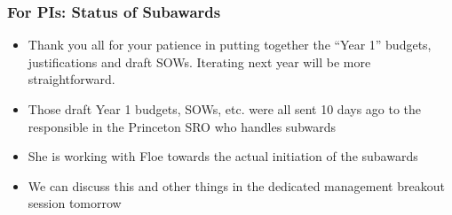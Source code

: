 \begin{frame}
\frametitle{For PIs: Status of Subawards}

\begin{itemize}
\item Thank you all for your patience in putting together the ``Year 1'' budgets, justifications and draft SOWs. Iterating next year will be more straightforward.
\item Those draft Year 1 budgets, SOWs, etc. were all sent 10 days ago to the responsible in the Princeton SRO who handles subwards
\item She is working with Floe towards the actual initiation of the subawards
\item We can discuss this and other things in the dedicated management breakout session tomorrow
\end{itemize}

\end{frame}


